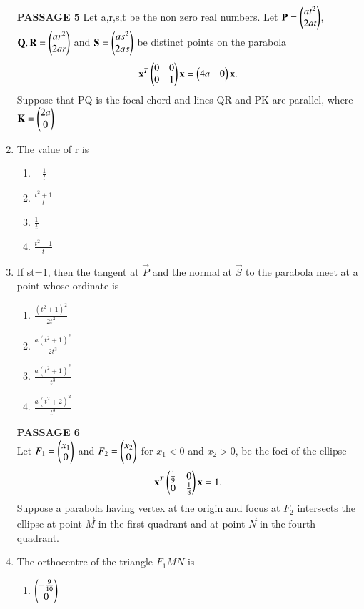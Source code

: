 \begin{enumerate}[label=\arabic*.,ref=\thesubsection.\theenumi]
    \textbf{PASSAGE 5}
    Let a,r,s,t be the non zero real numbers. Let $\mathbf{P}=\begin{pmatrix}at^2\\2at\end{pmatrix}$,$\mathbf{Q,R}=			\begin{pmatrix}ar^2\\2ar\end{pmatrix}$ and $\mathbf{S}=\begin{pmatrix}as^2\\2as\end{pmatrix}$ be distinct points on the parabola 
    \begin{align}
    \mathbf{x}^T\begin{pmatrix}0&0\\0&1\end{pmatrix}\mathbf{x}=\begin{pmatrix}4a&0\end{pmatrix}\mathbf{x}.
    \end{align} Suppose that PQ is the focal chord and lines QR and PK are parallel, where 
    $\mathbf{K}=\begin{pmatrix}2a\\0\end{pmatrix}$
    \item The value of r is 
    \begin{enumerate}
    \item $-\frac{1}{t}$
    \item $\frac{t^2+1}{t}$
    \item $\frac{1}{t}$
    \item $\frac{t^2-1}{t}$
    \end{enumerate}
    \item If st=1, then the tangent at $\vec{P}$ and the normal at $\vec{S}$ to the parabola meet at a point whose ordinate is 
   \begin{enumerate} 
   \item $\frac{(t^2+1)^2}{2t^3}$
   \item $\frac {a(t^2+1)^2}{2t^3}$
   \item $\frac {a(t^2+1)^2}{t^3}$
   \item $\frac {a(t^2+2)^2}{t^3}$
   \end{enumerate}   
   \textbf{PASSAGE 6}\\
   Let $F_1 = \begin{pmatrix}x_1\\0\end{pmatrix}$ and 
   $F_2 = \begin{pmatrix}x_2\\0\end{pmatrix}$ for $x_1<0$ and $x_2>0$, be the foci of the ellipse 
   \begin{align}
   \mathbf{x}^T\begin{pmatrix}\frac{1}{9}&0\\0&\frac{1}{8}\end{pmatrix}\mathbf{x}=1.
   \end{align} Suppose a parabola having vertex at the origin and focus at $F_2$ intersects the ellipse at point $\vec{M}$ in the first quadrant and at point $\vec{N}$ in the fourth quadrant.
    \item The orthocentre of the triangle $F_1MN$ is 
    \begin{enumerate}
    \item $\begin{pmatrix}-\frac{9}{10}\\0\end{pmatrix}$

\end{enumerate}
\end{enumerate}
